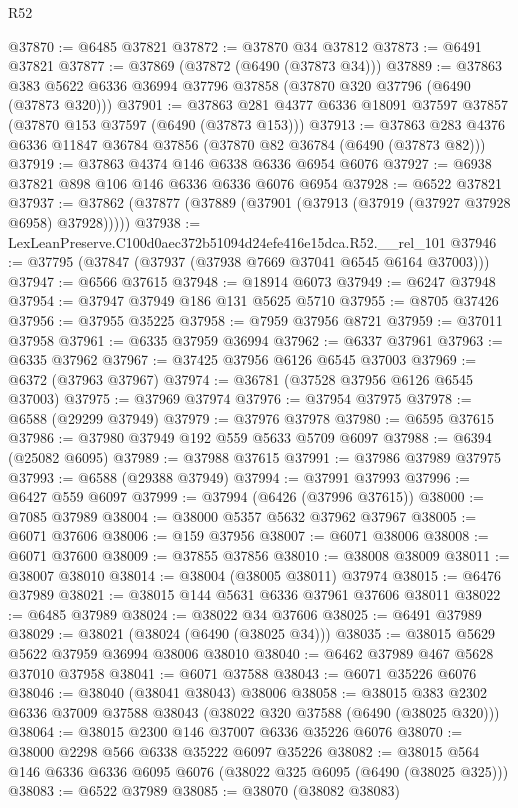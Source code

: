\begin{lexlean}{R52}
\begin{coremodule}
@37870 := @6485 @37821
@37872 := @37870 @34 @37812
@37873 := @6491 @37821
@37877 := @37869 (@37872 (@6490 (@37873 @34)))
@37889 := @37863 @383 @5622 @6336 @36994 @37796 @37858 (@37870 @320 @37796 (@6490 (@37873 @320)))
@37901 := @37863 @281 @4377 @6336 @18091 @37597 @37857 (@37870 @153 @37597 (@6490 (@37873 @153)))
@37913 := @37863 @283 @4376 @6336 @11847 @36784 @37856 (@37870 @82 @36784 (@6490 (@37873 @82)))
@37919 := @37863 @4374 @146 @6338 @6336 @6954 @6076
@37927 := @6938 @37821 @898 @106 @146 @6336 @6336 @6076 @6954
@37928 := @6522 @37821
@37937 := @37862 (@37877 (@37889 (@37901 (@37913 (@37919 (@37927 @37928 @6958) @37928)))))
@37938 := LexLeanPreserve.C100d0aec372b51094d24efe416e15dca.R52.__rel_101
@37946 := @37795 (@37847 (@37937 (@37938 @7669 @37041 @6545 @6164 @37003)))
@37947 := @6566 @37615
@37948 := @18914 @6073
@37949 := @6247 @37948
@37954 := @37947 @37949 @186 @131 @5625 @5710
@37955 := @8705 @37426
@37956 := @37955 @35225
@37958 := @7959 @37956 @8721
@37959 := @37011 @37958
@37961 := @6335 @37959 @36994
@37962 := @6337 @37961
@37963 := @6335 @37962
@37967 := @37425 @37956 @6126 @6545 @37003
@37969 := @6372 (@37963 @37967)
@37974 := @36781 (@37528 @37956 @6126 @6545 @37003)
@37975 := @37969 @37974
@37976 := @37954 @37975
@37978 := @6588 (@29299 @37949)
@37979 := @37976 @37978
@37980 := @6595 @37615
@37986 := @37980 @37949 @192 @559 @5633 @5709 @6097
@37988 := @6394 (@25082 @6095)
@37989 := @37988 @37615
@37991 := @37986 @37989 @37975
@37993 := @6588 (@29388 @37949)
@37994 := @37991 @37993
@37996 := @6427 @559 @6097
@37999 := @37994 (@6426 (@37996 @37615))
@38000 := @7085 @37989
@38004 := @38000 @5357 @5632 @37962 @37967
@38005 := @6071 @37606
@38006 := @159 @37956
@38007 := @6071 @38006
@38008 := @6071 @37600
@38009 := @37855 @37856
@38010 := @38008 @38009
@38011 := @38007 @38010
@38014 := @38004 (@38005 @38011) @37974
@38015 := @6476 @37989
@38021 := @38015 @144 @5631 @6336 @37961 @37606 @38011
@38022 := @6485 @37989
@38024 := @38022 @34 @37606
@38025 := @6491 @37989
@38029 := @38021 (@38024 (@6490 (@38025 @34)))
@38035 := @38015 @5629 @5622 @37959 @36994 @38006 @38010
@38040 := @6462 @37989 @467 @5628 @37010 @37958
@38041 := @6071 @37588
@38043 := @6071 @35226 @6076
@38046 := @38040 (@38041 @38043) @38006
@38058 := @38015 @383 @2302 @6336 @37009 @37588 @38043 (@38022 @320 @37588 (@6490 (@38025 @320)))
@38064 := @38015 @2300 @146 @37007 @6336 @35226 @6076
@38070 := @38000 @2298 @566 @6338 @35222 @6097 @35226
@38082 := @38015 @564 @146 @6336 @6336 @6095 @6076 (@38022 @325 @6095 (@6490 (@38025 @325)))
@38083 := @6522 @37989
@38085 := @38070 (@38082 @38083)

\end{coremodule}
\end{lexlean}
